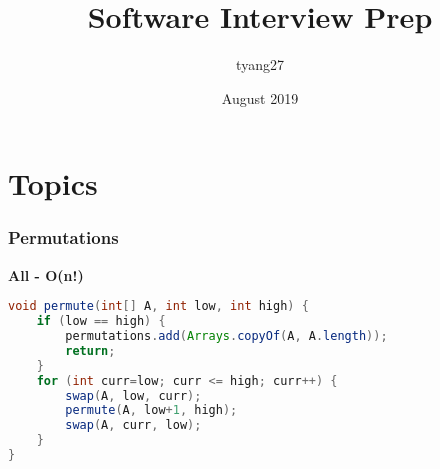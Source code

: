 \documentclass[10pt]{article}
\title{Software Interview Prep}
\author{tyang27}
\date{August 2019}
\begin{document}

\section{Topics}



\subsubsection{Permutations}
\textbf{All - O(n!)}
\begin{lstlisting}[language=java]
void permute(int[] A, int low, int high) {
    if (low == high) {
        permutations.add(Arrays.copyOf(A, A.length));
        return;
    }
    for (int curr=low; curr <= high; curr++) {
        swap(A, low, curr);
        permute(A, low+1, high);
        swap(A, curr, low);
    }
}
\end{lstlisting}
\end{document}
